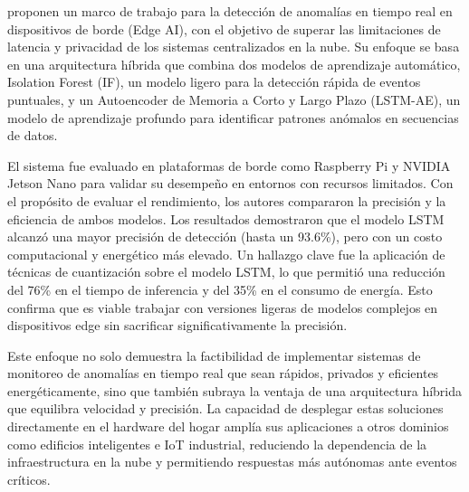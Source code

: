 \citeauthor{reis2025edge} \citeyear{reis2025edge} proponen un marco de trabajo para la detección de anomalías en tiempo real en dispositivos de borde (Edge AI), con el objetivo de superar las limitaciones de latencia y privacidad de los sistemas centralizados en la nube. Su enfoque se basa en una arquitectura híbrida que combina dos modelos de aprendizaje automático, Isolation Forest (IF), un modelo ligero para la detección rápida de eventos puntuales, y un Autoencoder de Memoria a Corto y Largo Plazo (LSTM-AE), un modelo de aprendizaje profundo para identificar patrones anómalos en secuencias de datos.

El sistema fue evaluado en plataformas de borde como Raspberry Pi y NVIDIA Jetson Nano para validar su desempeño en entornos con recursos limitados. Con el propósito de evaluar el rendimiento, los autores compararon la precisión y la eficiencia de ambos modelos. Los resultados demostraron que el modelo LSTM alcanzó una mayor precisión de detección (hasta un 93.6\%), pero con un costo computacional y energético más elevado. Un hallazgo clave fue la aplicación de técnicas de cuantización sobre el modelo LSTM, lo que permitió una reducción del 76\% en el tiempo de inferencia y del 35\% en el consumo de energía. Esto confirma que es viable trabajar con versiones ligeras de modelos complejos en dispositivos edge sin sacrificar significativamente la precisión.

Este enfoque no solo demuestra la factibilidad de implementar sistemas de monitoreo de anomalías en tiempo real que sean rápidos, privados y eficientes energéticamente, sino que también subraya la ventaja de una arquitectura híbrida que equilibra velocidad y precisión. La capacidad de desplegar estas soluciones directamente en el hardware del hogar amplía sus aplicaciones a otros dominios como edificios inteligentes e IoT industrial, reduciendo la dependencia de la infraestructura en la nube y permitiendo respuestas más autónomas ante eventos críticos.
